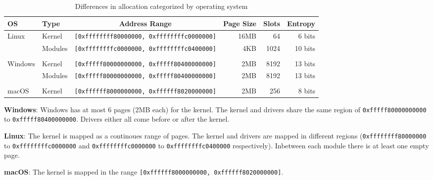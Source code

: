 \begin{table*}[!ht]
  \small
  \centering
  \begin{tabular}{llcrrr}
  \hline
    \textbf{OS} & \textbf{Type} & \textbf{Address Range} & \textbf{Page Size} & \textbf{Slots} & \textbf{Entropy} \\ \hline
    \multirow{2}{*}{Linux}   & Kernel  & {\lstinline[basicstyle=\ttfamily]![0xffffffff80000000, 0xffffffffc0000000]!} & 16MB &   64 &  6 bits \\
                             & Modules & {\lstinline[basicstyle=\ttfamily]![0xffffffffc0000000, 0xffffffffc0400000]!} &  4KB & 1024 & 10 bits \\ \\
    \multirow{2}{*}{Windows} & Kernel  & {\lstinline[basicstyle=\ttfamily]![0xfffff80000000000, 0xfffff80400000000]!} &  2MB & 8192 & 13 bits \\
                             & Modules & {\lstinline[basicstyle=\ttfamily]![0xfffff80000000000, 0xfffff80400000000]!} &  2MB & 8192 & 13 bits \\ \\
    macOS   & Kernel  & {\lstinline[basicstyle=\ttfamily]![0xffffff8000000000, 0xffffff8020000000]!} &  2MB &  256 &  8 bits \\ \hline
  \end{tabular}
  \caption{Differences in allocation categorized by operating system}
\end{table*}

\textbf{Windows}: Windows has at most 6 pages (2MB each) for the kernel.
The kernel and drivers share the same region of \lstinline{0xfffff80000000000} to \lstinline{0xfffff80400000000}.
Drivers either all come before or after the kernel.

\textbf{Linux}: The kernel is mapped as a continoues range of pages.
The kernel and drivers are mapped in different regions (\lstinline{0xffffffff80000000} to \lstinline{0xffffffffc0000000} and \lstinline{0xffffffffc0000000} to \lstinline{0xffffffffc0400000} respectively).
Inbetween each module there is at least one empty page.

\textbf{macOS}: The kernel is mapped in the range \lstinline{[0xffffff8000000000, 0xffffff8020000000]}.
